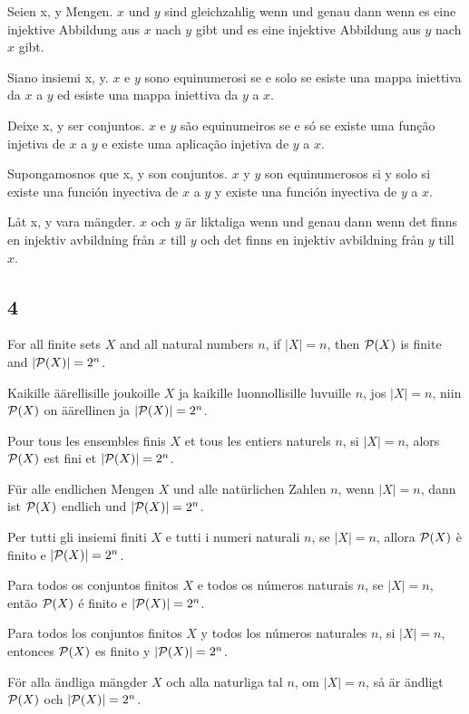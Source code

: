 \documentclass{article}
\newcommand{\pow}{{\cal P}}
\begin{document}
Seien x, y Mengen. $ x $ und $ y $ sind gleichzahlig wenn und genau dann wenn es eine injektive Abbildung aus $ x $ nach $ y $ gibt und es eine injektive Abbildung aus $ y $ nach $ x $ gibt.

Siano insiemi x, y. $ x $ e $ y $ sono equinumerosi se e solo se esiste una mappa iniettiva da $ x $ a $ y $ ed esiste una mappa iniettiva da $ y $ a $ x $.

Deixe x, y ser conjuntos. $ x $ e $ y $ são equinumeiros se e só se existe uma função injetiva de $ x $ a $ y $ e existe uma aplicação injetiva de $ y $ a $ x $.

Supongamosnos que x, y son conjuntos. $ x $ y $ y $ son equinumerosos si y solo si existe una función inyectiva de $ x $ a $ y $ y existe una función inyectiva de $ y $ a $ x $.

Låt x, y vara mängder. $ x $ och $ y $ är liktaliga wenn und genau dann wenn det finns en injektiv avbildning från $ x $ till $ y $ och det finns en injektiv avbildning från $ y $ till $ x $.

\subsection*{4}

For all finite sets $ X $ and all natural numbers $ n $, if $ |X| = n $, then $ \pow(X) $ is finite and $ |\pow(X)| = 2^{n} $.

Kaikille äärellisille joukoille $ X $ ja kaikille luonnollisille luvuille $ n $, jos $ |X| = n $, niin $ \pow(X) $ on äärellinen ja $ |\pow(X)| = 2^{n} $.

Pour tous les ensembles finis $ X $ et tous les entiers naturels $ n $, si $ |X| = n $, alors $ \pow(X) $ est fini et $ |\pow(X)| = 2^{n} $.

Für alle endlichen Mengen $ X $ und alle natürlichen Zahlen $ n $, wenn $ |X| = n $, dann ist $ \pow(X) $ endlich und $ |\pow(X)| = 2^{n} $.

Per tutti gli insiemi finiti $ X $ e tutti i numeri naturali $ n $, se $ |X| = n $, allora $ \pow(X) $ è finito e $ |\pow(X)| = 2^{n} $.

Para todos os conjuntos finitos $ X $ e todos os números naturais $ n $, se $ |X| = n $, então $ \pow(X) $ é finito e $ |\pow(X)| = 2^{n} $.

Para todos los conjuntos finitos $ X $ y todos los números naturales $ n $, si $ |X| = n $, entonces $ \pow(X) $ es finito y $ |\pow(X)| = 2^{n} $.

För alla ändliga mängder $ X $ och alla naturliga tal $ n $, om $ |X| = n $, så är ändligt $ \pow(X) $ och $ |\pow(X)| = 2^{n} $.
\end{document}
